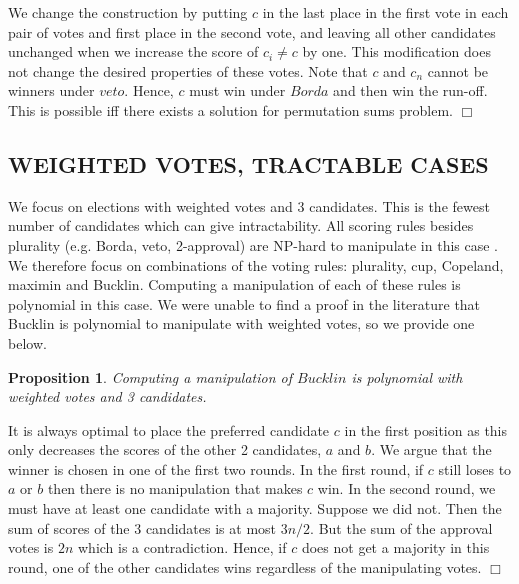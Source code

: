 \documentclass{ecai2012}
\newtheorem{proposition}{Proposition}
\newcommand{\myproof}{\vspace{-3mm}\noindent {\bf Proof:\ \ }}
\newcommand{\myqed}{\mbox{$\Box$}}
\begin{document}
\vspace{-1mm}We change the construction by putting $c$ in the last place
in the first vote in each pair of votes and first place in the second
vote, and leaving all other candidates unchanged when we increase
the score of $c_i \neq c$ by one.
This modification does not change the desired properties of these votes.
Note that $c$ and $c_n$ cannot be winners
under $veto$. Hence, $c$ must win under $Borda$ and then
win the run-off.
This is possible iff there exists a solution for permutation sums problem.
\myqed


\subsection*{WEIGHTED VOTES, TRACTABLE CASES}

We focus on elections with weighted votes
and 3 candidates.
This is the fewest number
of candidates which can give intractability.
All scoring rules besides
plurality (e.g. Borda, veto, 2-approval)
are NP-hard to manipulate in this case
\cite{dichotomy}.
We therefore focus on combinations of the voting rules:
plurality, cup, Copeland, maximin and Bucklin.
Computing a manipulation of each of these
rules is polynomial in this case.
We were unable to find a proof in the literature
that Bucklin is polynomial to manipulate with weighted votes,
so we provide one below.

\begin{proposition}
Computing a manipulation of $Bucklin$
is polynomial with weighted votes and 3 candidates.
\end{proposition}
\myproof
It is always optimal to place the
preferred candidate $c$ in the first
position as this only decreases the scores of
the other 2 candidates, $a$ and $b$.
We argue that the winner is
chosen in one of the first two rounds.
In the first round, if $c$ still loses to
$a$ or $b$ then there is no manipulation
that makes $c$ win.
In the second round, we must have at least
one candidate with a majority. Suppose we did not.
Then the sum of scores of the 3 candidates is at most
$3n/2$. But the sum of the approval votes is $2n$
which is a contradiction. Hence, if $c$ does not
get a majority in this round, one of the other
candidates wins regardless of the manipulating
votes.
%
\myqed
\end{document}
